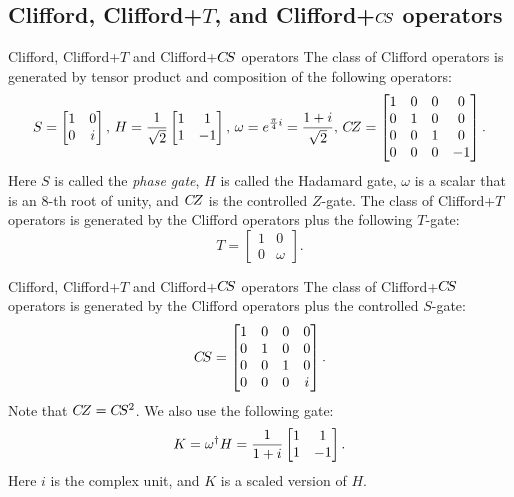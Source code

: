 \documentclass[compress,noamsthm,hyperref={bookmarksopen=true},aspectratio=169]{beamer}
\begin{document}
\subsection{Clifford, Clifford+$T$, and Clifford+$C\kern-.16667em S$ operators}
\begin{frame}{Clifford, Clifford+$T$ and Clifford+$C\kern-.16667em S$ operators}
The class of Clifford operators is generated by tensor product and
composition of the following operators:
\[ S =  \begin{bmatrix}
    1 & 0 \\
    0 & i
  \end{bmatrix},
  \, H =  \frac{1}{\sqrt 2}\begin{bmatrix}
    1 & 1 \\
    1 & -1
  \end{bmatrix},
  \, \omega = e^{\frac{\pi}{4}i}=\frac{1+i}{\sqrt 2},
  \, C\kern-.16667em Z = \begin{bmatrix}
    1 & 0 & 0 & 0 \\
    0 & 1 & 0 & 0 \\
    0 & 0 & 1 & 0 \\
    0 & 0 & 0 & -1 
  \end{bmatrix}.
\]
Here $S$ is called the \emph{phase gate}, $H$ is called the Hadamard
gate, $\omega$ is a scalar that is an $8$-th root of unity, and $C\kern-.16667em Z$
is the controlled $Z$-gate. The class of Clifford+$T$ operators is
generated by the Clifford operators plus the following $T$-gate:
\[ T =  \begin{bmatrix}
    1 & 0 \\
    0 & \omega
  \end{bmatrix}.
\]

\end{frame}

\begin{frame}{Clifford, Clifford+$T$ and Clifford+$C\kern-.16667em S$ operators}
  The class of Clifford+$C\kern-.16667em S$ operators is generated by the Clifford
  operators plus the controlled $S$-gate:
\[
    C\kern-.16667em S = \begin{bmatrix}
    1 & 0 & 0 & 0 \\
    0 & 1 & 0 & 0 \\
    0 & 0 & 1 & 0 \\
    0 & 0 & 0 & i 
  \end{bmatrix}.
\]
Note that $C\kern-.16667em Z=C\kern-.16667em S^2$. We also use the following gate:
\[
K = \omega^{\dagger} H = \frac{1}{1+i}\begin{bmatrix}
    1 & 1 \\
    1 & -1
  \end{bmatrix}.
\]
Here $i$ is the complex unit, and $K$ is a scaled version of $H$.

\end{frame}
\end{document}
